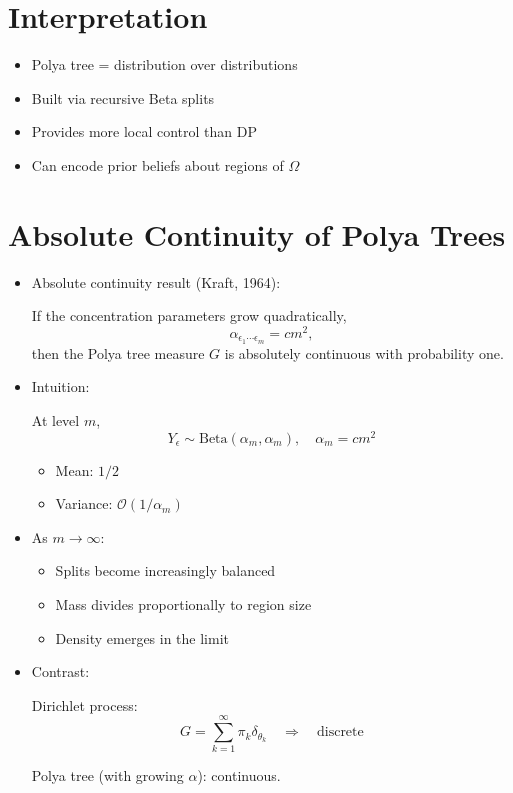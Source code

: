 \documentclass[12pt,oneside]{book}
\numberwithin{equation}{section}
\theoremstyle{definition}
\theoremstyle{plain}
\theoremstyle{remark}
\begin{document}
\section{Interpretation}

\begin{itemize}
\item Polya tree = distribution over distributions
\item Built via recursive Beta splits
\item Provides more local control than DP
\item Can encode prior beliefs about regions of $\Omega$
\end{itemize}

\section{Absolute Continuity of Polya Trees}

\begin{itemize}
\item Absolute continuity result (Kraft, 1964):

If the concentration parameters grow quadratically,
\[
\alpha_{\epsilon_1 \cdots \epsilon_m} = c m^2,
\]
then the Polya tree measure $G$ is absolutely continuous with probability one.

\item Intuition:

At level $m$,
\[
Y_\epsilon \sim \text{Beta}(\alpha_m, \alpha_m), \quad \alpha_m = c m^2
\]

\begin{itemize}
\item Mean: $1/2$
\item Variance: $\mathcal{O}(1/\alpha_m)$
\end{itemize}

\item As $m \to \infty$:
\begin{itemize}
\item Splits become increasingly balanced
\item Mass divides proportionally to region size
\item Density emerges in the limit
\end{itemize}

\item Contrast:

Dirichlet process:
\[
G = \sum_{k=1}^\infty \pi_k \delta_{\theta_k}
\quad \Rightarrow \quad \text{discrete}
\]

Polya tree (with growing $\alpha$): continuous.
\end{itemize}
\end{document}
